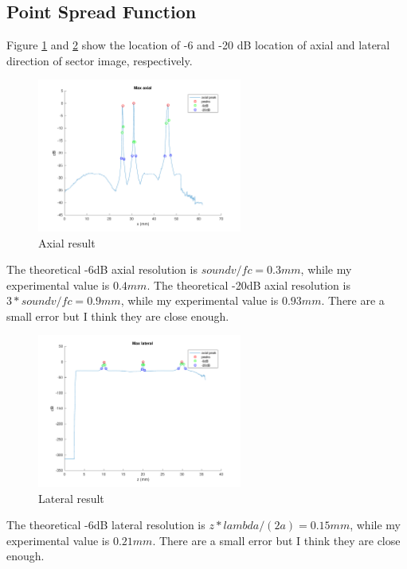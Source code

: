 \documentclass{article}
\begin{document}
\subsection{Point Spread Function}
Figure \ref{fig:RF-axial} and \ref{fig:RF-lateral} show the location of -6 and -20 dB location of axial and lateral direction of
sector image, respectively.
\begin{figure}[H]
    \centering
    \includegraphics[width=0.6\textwidth]{src/RF/axial.pdf}
    \caption{Axial result}
    \label{fig:RF-axial}
\end{figure}
The theoretical -6dB axial resolution is $soundv / fc = 0.3 mm$, while my experimental value is $0.4 mm$. The theoretical 
-20dB axial resolution is $3 * soundv / fc = 0.9 mm$, while my experimental value is $0.93 mm$. There are a small error but I
think they are close enough.

\begin{figure}[H]
    \centering
    \includegraphics[width=0.6\textwidth]{src/RF/lateral.pdf}
    \caption{Lateral result}
    \label{fig:RF-lateral}
\end{figure}
The theoretical -6dB lateral resolution is $z * lambda / (2a) = 0.15 mm$, while my experimental value is $0.21 mm$. There are a 
small error but I think they are close enough.
\end{document}
